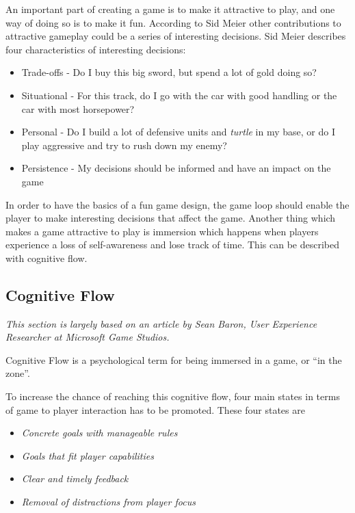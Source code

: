 An important part of creating a game is to make it attractive to play, and one way of doing so is to make it fun.
According to Sid Meier\cite{GDC2012} other contributions to attractive gameplay could be a series of interesting decisions.
Sid Meier describes four characteristics of interesting decisions:\cite{GDC2012}
\begin{itemize}
	\item Trade-offs - Do I buy this big sword, but spend a lot of gold doing so?
	\item Situational - For this track, do I go with the car with good handling or the car with most horsepower?
	\item Personal - Do I build a lot of defensive units and \textit{turtle} in my base, or do I play aggressive and try to rush down my enemy?
	\item Persistence - My decisions should be informed and have an impact on the game
\end{itemize}

In order to have the basics of a fun game design, the game loop should enable the player to make interesting decisions that affect the game.
Another thing which makes a game attractive to play is immersion which happens when players experience a loss of self-awareness and lose track of time.
This can be described with cognitive flow.

\subsection{Cognitive Flow}\label{makingthegamefun:cognitiveflow}
\emph{This section is largely based on an article by Sean Baron, User Experience Researcher at Microsoft Game
Studios\cite{baron}.}

Cognitive Flow is a psychological term for being immersed in a game, or ``in the zone''.

To increase the chance of reaching this cognitive flow, four main states in terms of game to player interaction has to
be promoted.  
These four states are 
\begin{itemize}
    \item \emph{Concrete goals with manageable rules}
    \item \emph{Goals that fit player capabilities}
    \item \emph{Clear and timely feedback}
    \item \emph{Removal of distractions from player focus}
\end{itemize}

